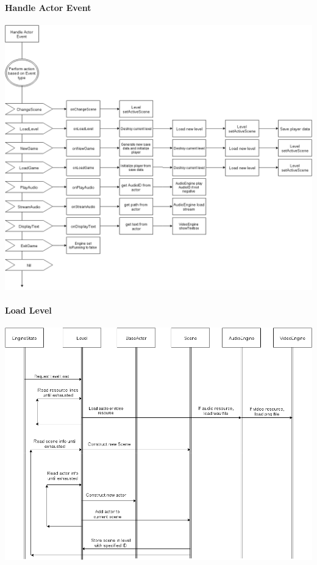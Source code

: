 \documentclass{article}
\begin{document}
			\paragraph{Handle Actor Event}
				\begin{center}
					\includegraphics[scale=0.48,angle=90]{handle-actor-event.png}
				\end{center}
			\paragraph{Load Level}
				\begin{center}
					\includegraphics[scale=0.58,angle=90]{load-level.png}
				\end{center}
\end{document}

